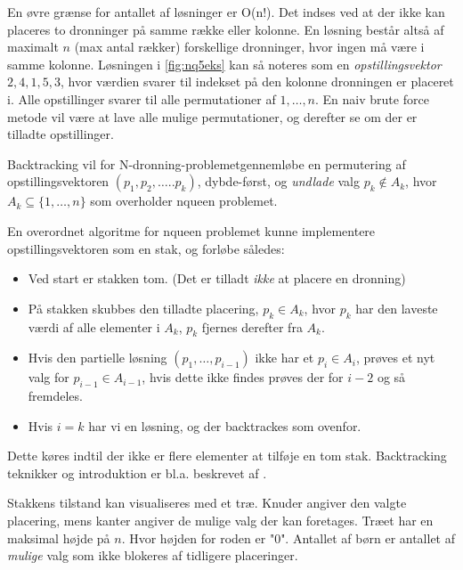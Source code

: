 \documentclass[pdf,draft,a4paper,11pt]{article}
\newcommand{\nq}{N-dronning-problemet}
\begin{document}
En øvre grænse for antallet af løsninger er O(n!). Det indses ved at der ikke kan placeres to dronninger på samme række eller kolonne. En løsning består altså af maximalt $n$ (max antal rækker) forskellige dronninger, hvor ingen må være i samme kolonne. Løsningen i \ref{fig:nq5eks} kan så noteres som en \emph{opstillingsvektor} $2,4,1,5,3$, hvor værdien svarer til indekset på den kolonne dronningen er placeret i. Alle opstillinger svarer til alle  permutationer af ${1,\ldots,n}$. En naiv brute force metode vil være at lave alle mulige permutationer, og derefter se om der er tilladte opstillinger.

Backtracking vil for \nq gennemløbe en permutering af opstillingsvektoren  $(p_1,p_2,\ldots..p_k)$, dybde-først, og \emph{undlade} valg $p_k \notin A_k$, hvor $A_k\subseteq \{1,\ldots,n\}$  som overholder nqueen problemet. 

En overordnet algoritme for nqueen problemet kunne implementere opstillingsvektoren som en stak, og forløbe således:
\begin{itemize}
\item Ved start er stakken tom. (Det er tilladt \emph{ikke} at placere en dronning)
\item På stakken skubbes den tilladte placering, $p_k \in A_k$, hvor $p_k$ har den laveste værdi af alle elementer i $A_k$, $p_k$ fjernes derefter fra $A_k$.
\item Hvis den partielle løsning $(p_1,\ldots,p_{i-1})$ ikke har et $p_i \in A_i$, prøves et nyt valg for $p_{i-1} \in A_{i-1}$, hvis dette ikke findes prøves der for $i-2$ og så fremdeles. 
\item Hvis $i=k$ har vi en løsning,  og der backtrackes som ovenfor.
\end{itemize}
Dette køres indtil der ikke er flere elementer at tilføje en tom stak.
Backtracking teknikker og introduktion er bl.a. beskrevet af \cite{Golomb72}.

Stakkens tilstand kan visualiseres med et træ. Knuder angiver den valgte placering, mens kanter angiver de mulige valg der kan foretages.  Træet har en maksimal højde på $n$. Hvor højden for roden er "0". Antallet af børn er antallet af \emph{mulige} valg som ikke blokeres af tidligere placeringer. 
\end{document}
